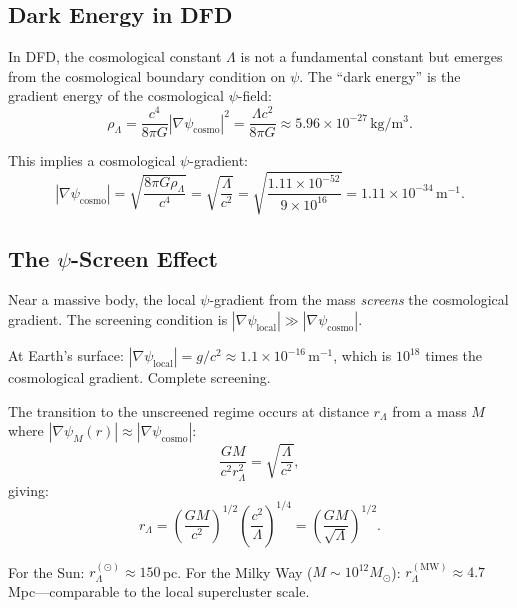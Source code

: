 \documentclass[11pt]{article}
\theoremstyle{definition}
\theoremstyle{remark}
\begin{document}
\subsection{Dark Energy in DFD}

In DFD, the cosmological constant $\Lambda$ is not a fundamental
constant but emerges from the cosmological boundary condition on $\psi$.
The ``dark energy'' is the gradient energy of the cosmological $\psi$-field:
\begin{equation}
\rho_\Lambda = \frac{c^4}{8\pi G} |\nabla\psi_{\mathrm{cosmo}}|^2
= \frac{\Lambda c^2}{8\pi G} \approx 5.96 \times 10^{-27}\,\mathrm{kg/m^3}.
\end{equation}

This implies a cosmological $\psi$-gradient:
\begin{equation}
|\nabla\psi_{\mathrm{cosmo}}| = \sqrt{\frac{8\pi G \rho_\Lambda}{c^4}}
= \sqrt{\frac{\Lambda}{c^2}}
= \sqrt{\frac{1.11 \times 10^{-52}}{9 \times 10^{16}}}
= 1.11 \times 10^{-34}\,\mathrm{m}^{-1}.
\end{equation}

\subsection{The $\psi$-Screen Effect}

Near a massive body, the local $\psi$-gradient from the mass
\emph{screens} the cosmological gradient. The screening condition
is $|\nabla\psi_{\mathrm{local}}| \gg |\nabla\psi_{\mathrm{cosmo}}|$.

At Earth's surface: $|\nabla\psi_{\mathrm{local}}| = g/c^2 \approx
1.1 \times 10^{-16}$\,m$^{-1}$, which is $10^{18}$ times the
cosmological gradient. Complete screening.

The transition to the unscreened regime occurs at distance $r_\Lambda$
from a mass $M$ where $|\nabla\psi_M(r)| \approx |\nabla\psi_{\mathrm{cosmo}}|$:
\begin{equation}
\frac{GM}{c^2 r_\Lambda^2} = \sqrt{\frac{\Lambda}{c^2}},
\end{equation}
giving:
\begin{equation}
r_\Lambda = \left(\frac{GM}{c^2}\right)^{1/2}
\left(\frac{c^2}{\Lambda}\right)^{1/4}
= \left(\frac{GM}{\sqrt{\Lambda}}\right)^{1/2}.
\end{equation}

For the Sun: $r_\Lambda^{(\odot)} \approx 150$\,pc.
For the Milky Way ($M \sim 10^{12} M_\odot$): $r_\Lambda^{(\mathrm{MW})}
\approx 4.7$\,Mpc---comparable to the local supercluster scale.
\end{document}
